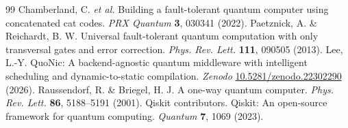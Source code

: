 \documentclass[11pt]{article}
\begin{document}
\begin{thebibliography}{99}
 Chamberland, C. \textit{et al.} Building a fault-tolerant quantum computer using concatenated cat codes. \textit{PRX Quantum} \textbf{3}, 030341 (2022).
 Paetznick, A. \& Reichardt, B. W. Universal fault-tolerant quantum computation with only transversal gates and error correction. \textit{Phys. Rev. Lett.} \textbf{111}, 090505 (2013).
 Lee, L.-Y. QuoNic: A backend-agnostic quantum middleware with intelligent scheduling and dynamic-to-static compilation. \textit{Zenodo} \href{https://doi.org/10.5281/zenodo.22302290}{10.5281/zenodo.22302290} (2026).
 Raussendorf, R. \& Briegel, H. J. A one-way quantum computer. \textit{Phys. Rev. Lett.} \textbf{86}, 5188--5191 (2001).
 Qiskit contributors. Qiskit: An open-source framework for quantum computing. \textit{Quantum} \textbf{7}, 1069 (2023).
\end{thebibliography}
\end{document}
